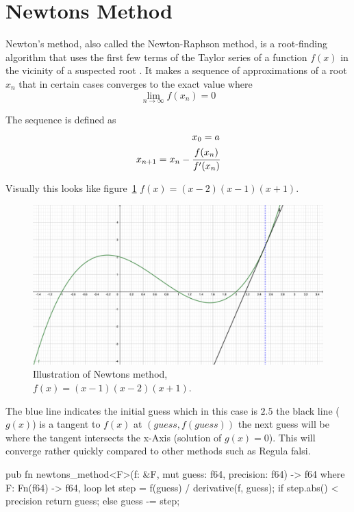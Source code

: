 \documentclass[11pt,DIV=10,final]{scrreprt} %
\begin{document}
\section{Newtons Method}
Newton's method, also called the Newton-Raphson method, is a root-finding algorithm that uses the first few terms of the Taylor series of a function $f(x)$ in the vicinity of a suspected root
\citep{math:newton}. It makes a sequence of approximations of a root $x_{n}$ that in certain cases converges to the exact value where
\[
  \lim _{n \to \infty}f(x_{n}) = 0
\]

The sequence is defined as
\begin{align*}
  x_{0}=a \\*
  x_{n+1}=x_{n}-\cfrac{f(x_{n})}{f'(x_{n})}
\end{align*}

Visually this looks like figure~\ref{fig:newton-ilust} $f(x) = (x-2)(x-1)(x+1)$.
\begin{figure}[H]
	\includegraphics[width=\textwidth]{plots/newtons-method.pdf}
	\caption{Illustration of Newtons method, $f(x) = (x-1)(x-2)(x+1)$.}
	\label{fig:newton-ilust}
\end{figure}
The blue line indicates the initial guess which in this case is $2.5$ the black line ($g(x)$) is a tangent to $f(x)$ at $(guess, f(guess))$ the next guess will be where
the tangent intersects the x-Axis (solution of $g(x) = 0$). This will converge rather quickly compared to other methods such as Regula falsi.

\pagebreak
\begin{rustcode}\nopagebreak
pub fn newtons_method<F>(f: &F, mut guess: f64, precision: f64) -> f64
    where
        F: Fn(f64) -> f64,
{
    loop {
        let step = f(guess) / derivative(f, guess);
        if step.abs() < precision {
            return guess;
        } else {
            guess -= step;
        }
    }
}
\end{rustcode}
\end{document}
